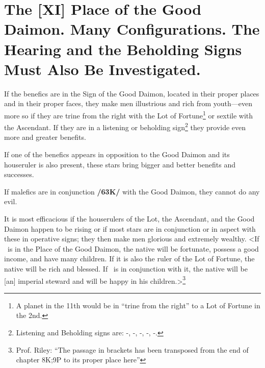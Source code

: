 \section{The [XI] Place of the Good Daimon. Many Configurations. The Hearing and the Beholding Signs Must Also Be Investigated.}
If the benefics are in the Sign of the Good Daimon, located in their proper places and in their proper faces, they make men illustrious and rich from youth—even more so if they are trine from the right with the Lot of Fortune\footnote{A planet in the 11th would be in ``trine from the right'' to a Lot of Fortune in the 2nd.} or sextile with the Ascendant. If they are in a listening or beholding sign\footnote{Listening and Beholding signs are: \Leo-\Gemini, \Virgo-\Taurus, \Libra-\Aries, \Scorpio-\Pisces, \Sagittarius-\Aquarius.} they provide even more and greater benefits. 

If one of the benefics appears in opposition to the Good Daimon and its houseruler is also present, these stars bring bigger and better benefits and successes. 

If malefics are in conjunction \textbf{/63K/} with the Good Daimon, they cannot do any evil. 

It is most efficacious if the houserulers of the Lot, the Ascendant, and the Good Daimon happen to be rising or if most stars are in conjunction or in aspect with these in operative signs; they then make men glorious and extremely wealthy. 
<If \Jupiter\, is in the Place of the Good Daimon, the native will be fortunate, possess a good income, and have many
children. If it is also the ruler of the Lot of Fortune, the native will be rich and blessed. If \Mercury\, is in conjunction with it, the native will be [an] imperial steward and will be happy in his children.>\footnote{Prof. Riley: ``The passage in brackets has been transposed from the end of chapter 8K;9P to its proper place here''}

\newpage